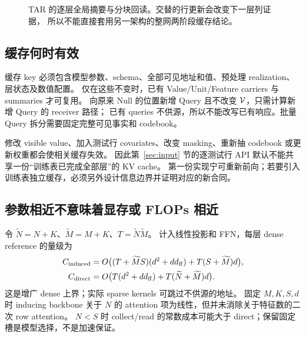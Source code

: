\documentclass[11pt,UTF8,fontset=fandol]{ctexart}
\begin{document}
\begin{figure}[htbp]\centering
{}
\caption{TAR 的逐层全局摘要与分块回读。交替的行更新会改变下一层列证据，
所以不能直接套用另一架构的整网两阶段缓存结论。}
\label{fig:cache}
\end{figure}

\subsection{缓存何时有效}
缓存 key 必须包含模型参数、schema、全部可见地址和值、预处理 realization、层状态及数值配置。
仅在这些不变时，已有 Value/Unit/Feature carriers 与 summaries 才可复用。
向原来 Null 的位置新增 Query 且不改变 $\mathcal V$，只需计算新增 Query 的 receiver 路径；
已有 queries 不供源，所以不能改写已有响应。批量 Query 拆分需要固定完整可见事实和 codebook。

修改 visible value、加入测试行 covariates、改变 masking、重新抽 codebook 或更新权重都会使相关缓存失效。
因此第~\ref{sec:input} 节的逐测试行 API 默认不能共享一份“训练表已完成全部层”的 KV cache。
第一份实现宁可重新前向；若要引入训练表独立缓存，必须另外设计信息边界并证明对应的新合同。

\subsection{参数相近不意味着显存或 FLOPs 相近}
令 $\widetilde N=N+K$、$\widetilde M=M+K$、$T=\widetilde N\widetilde M$。
计入线性投影和 FFN，每层 dense reference 的量级为
\begin{align}
 C_{\rm induced}&=O\big((T+\widetilde MS)(d^2+dd_{\rm ff})
                    +T(S+\widetilde M)d\big),\\
 C_{\rm direct}&=O\big(T(d^2+dd_{\rm ff})+T(\widetilde N+\widetilde M)d\big).
 \label{eq:cost}
\end{align}
这是增广 dense 上界；实际 sparse kernels 可跳过不供源的地址。
固定 $M,K,S,d$ 时 inducing backbone 关于 $N$ 的 attention 项为线性，但并未消除关于特征数的二次 row attention。
$N<S$ 时 collect/read 的常数成本可能大于 direct；保留固定槽是模型选择，不是加速保证。
\end{document}
